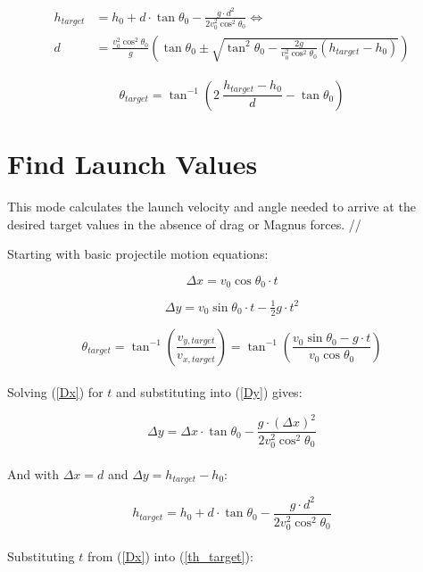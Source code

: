 \documentclass[a4paper]{article}
\begin{document}
	\begin{gather}
	\begin{aligned}
		h_{target} &= h_0 + d \cdot \tan \theta_0 - \frac{g \cdot d^2}{2 v_0^2 \cos^2 \theta_0} \iff \\
		d &= \frac{v_0^2 \cos^2 \theta_0}{g} \left( \tan \theta_0 \pm \sqrt{\tan^2 \theta_0 - \frac{2g}{v_0^2 \cos^2 \theta_0} \left( h_{target} - h_0 \right) } \right)
	\end{aligned}
	\end{gather}
	
	\begin{equation}
		\theta_{target} = \tan^{-1} \left( 2\ \frac{h_{target} - h_0}{d} - \tan \theta_0 \right)
	\end{equation}
	
	
	\section*{Find Launch Values}
	
	This mode calculates the launch velocity and angle needed to arrive at the desired target values in the absence of drag or Magnus forces. //
	
	Starting with basic projectile motion equations:
	
	\begin{equation} \label{Dx}
		\Delta x = v_0 \cos \theta_0 \cdot t
	\end{equation}
	
	\begin{equation} \label{Dy}
		\Delta y = v_0 \sin \theta_0 \cdot t - \tfrac{1}{2} g \cdot t^2
	\end{equation}
	
	\begin{equation} \label{th_target}
		\theta_{target} = \tan^{-1} \left( \frac{v_{y, target}}{v_{x, target}} \right) = \tan^{-1} \left( \frac{v_0 \sin \theta_0 - g \cdot t}{v_0 \cos \theta_0} \right)
	\end{equation}
	\\
	Solving (\ref{Dx}) for $ t $ and substituting into (\ref{Dy}) gives:
	
	\begin{equation}
		\Delta y = \Delta x \cdot \tan \theta_0 - \frac{g \cdot \left( \Delta x \right)^2}{2 v_0^2 \cos^2 \theta_0}
	\end{equation}
	\\
	And with $ \Delta x = d $ and $ \Delta y = h_{target} - h_0 $:
	
	\begin{equation} \label{hf}
		h_{target} = h_0 + d \cdot \tan \theta_0 - \frac{g \cdot d^2}{2 v_0^2 \cos^2 \theta_0}
	\end{equation}
	\\
	Substituting $ t $ from (\ref{Dx}) into (\ref{th_target}):
	
\end{document}
